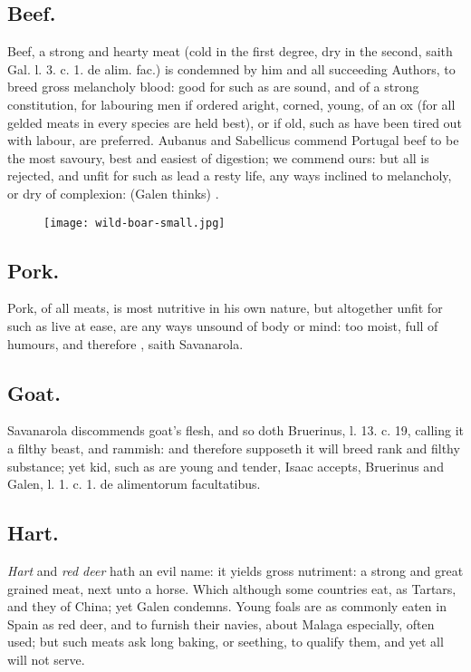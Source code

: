 {{\subsection{Beef.}
Beef, a strong and hearty meat (cold in the first degree, dry
in the second, saith \textlatin{Gal. l. 3. c. 1. de alim. fac.}) is condemned by
him and all succeeding Authors, to breed gross melancholy blood: good
for such as are sound, and of a strong constitution, for labouring men
if ordered aright, corned, young, of an ox (for all gelded meats in
every species are held best), or if old, such as have been tired
out with labour, are preferred. Aubanus and Sabellicus commend Portugal
beef to be the most savoury, best and easiest of digestion; we commend
ours: but all is rejected, and unfit for such as lead a resty life, any
ways inclined to melancholy, or dry of complexion:  (Galen thinks)
.
\begin{figure}[H]
  \begingroup
  \centering
  \texttt{[image: wild-boar-small.jpg]}
  \label{fig:wildboar}
\end{figure}
\subsection{Pork.}
Pork, of all meats, is most nutritive in his own nature,
 but altogether unfit for such as live at ease, are any ways
unsound of body or mind: too moist, full of humours, and therefore
, saith Savanarola.
\subsection{Goat.}
Savanarola discommends goat's flesh, and so doth
\textlatin{Bruerinus, l. 13. c. 19}, calling it a filthy beast, and rammish:
and therefore supposeth it will breed rank and filthy substance; yet
kid, such as are young and tender, Isaac accepts, Bruerinus and Galen,
\textlatin{l. 1. c. 1. de alimentorum facultatibus.}
\subsection{Hart.}
\emph{Hart} and \emph{red deer} hath an evil name: it yields gross
nutriment: a strong and great grained meat, next unto a horse. Which
although some countries eat, as Tartars, and they of China; yet 
Galen condemns. Young foals are as commonly eaten in Spain as red deer,
and to furnish their navies, about Malaga especially, often used; but
such meats ask long baking, or seething, to qualify them, and yet all
will not serve.

}}
